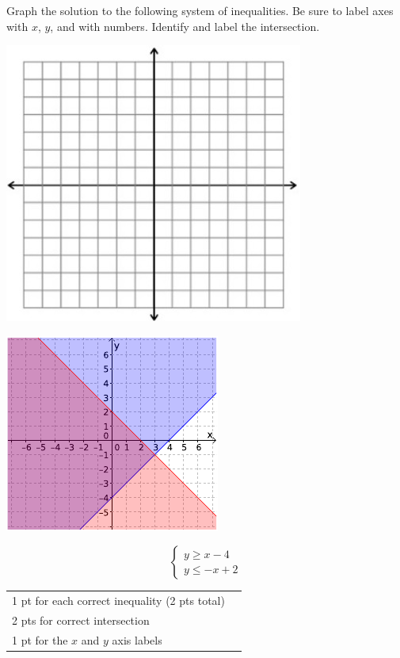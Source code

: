 {
	Graph the solution to the following system of inequalities. Be sure to label axes with $x$, $y$, and with numbers. Identify and label the intersection. \begin{onlyproblem}\begin{center}\includegraphics{fig-graphpaper.png}\end{center}\end{onlyproblem} \begin{onlysolution}\begin{center}\includegraphics{fig095-12-d-answer}\end{center}\end{onlysolution}
	$$\begin{cases}y\geq x-4\\ y\leq -x+2 \end{cases}$$
}
{
	\begin{tabular}{l r}
	1 pt for each correct inequality (2 pts total)\\
	2 pts for correct intersection\\
	1 pt for the $x$ and $y$ axis labels\\
	\end{tabular}
}

